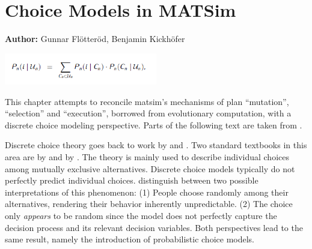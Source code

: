 \chapter{Choice Models in MATSim}
\label{ch:discretechoice}

\hfill \textbf{Author:} Gunnar Flötteröd, Benjamin Kickhöfer


\begin{center} \includegraphics[width=0.5\textwidth, angle=0]{understanding/figures/dc.png} \end{center}

This chapter attempts to reconcile \gls{matsim}'s mechanisms of plan
{}``mutation'', {}``selection'' and {}``execution'', borrowed from evolutionary computation, with a 
discrete choice modeling perspective. 
Parts of the following text are taken from \citet[][Section~2.3]{Kickhoefer_PhDThesis_2014}.

Discrete choice theory goes back to work by \citet{Luce1965PreferenceUtility} and 
\citet{McFadden1975DiscreteChoiceModel}. Two standard textbooks in this area are by
\citet{BenAkivaLerman_1985} and by \citet{Train_2003}. The theory is mainly used 
to describe individual choices among 
mutually exclusive %
alternatives. 
Discrete choice models typically do not perfectly predict individual choices.
\citet{Luce1965PreferenceUtility} distinguish between two possible interpretations of this phenomenon:
(1) People choose randomly among their alternatives, rendering their behavior inherently unpredictable.
(2) The choice only \emph{appears} to be random since the model does not
perfectly capture the decision process and its relevant decision variables.
Both perspectives lead to the same result, namely the %
introduction of probabilistic choice models.

